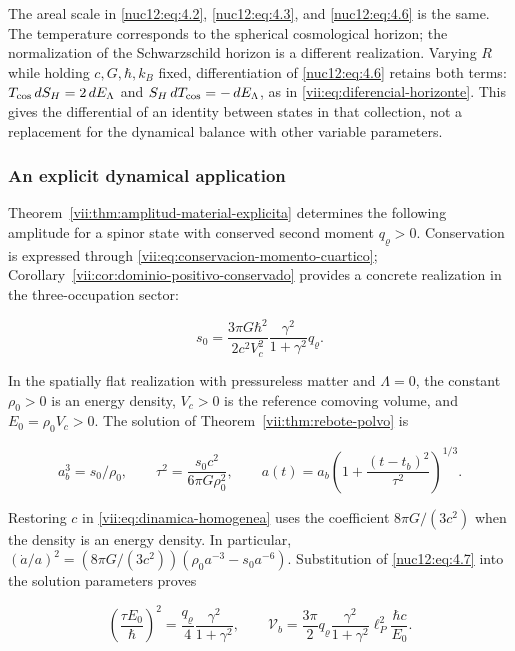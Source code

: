 The areal scale in \eqref{nuc12:eq:4.2}, \eqref{nuc12:eq:4.3}, and \eqref{nuc12:eq:4.6} is the same. The temperature corresponds to the spherical cosmological horizon; the normalization of the Schwarzschild horizon is a different realization. Varying \(R\) while holding \(c,G,\hbar,k_B\) fixed, differentiation of \eqref{nuc12:eq:4.6} retains both terms: \(T_{\rm cos}\,dS_H=2\,dE_\Lambda\) and \(S_H\,dT_{\rm cos}=-\,dE_\Lambda\), as in \eqref{vii:eq:diferencial-horizonte}. This gives the differential of an identity between states in that collection, not a replacement for the dynamical balance with other variable parameters.

\subsubsection{An explicit dynamical application}

Theorem~\ref{vii:thm:amplitud-material-explicita} determines the following amplitude for a spinor state with conserved second moment \(q_\varrho>0\). Conservation is expressed through \eqref{vii:eq:conservacion-momento-cuartico}; Corollary~\ref{vii:cor:dominio-positivo-conservado} provides a concrete realization in the three-occupation sector:

\begin{equation}
s_0=\frac{3\pi G\hbar^2}{2c^2V_c^2}
\frac{\gamma^2}{1+\gamma^2}q_\varrho .
\label{nuc12:eq:4.7}
\end{equation}

In the spatially flat realization with pressureless matter and \(\Lambda=0\), the constant \(\rho_0>0\) is an energy density, \(V_c>0\) is the reference comoving volume, and \(E_0=\rho_0V_c>0\). The solution of Theorem~\ref{vii:thm:rebote-polvo} is

\[
a_b^3=s_0/\rho_0,\qquad
\tau^2=\frac{s_0c^2}{6\pi G\rho_0^2},\qquad
a(t)=a_b\left(1+\frac{(t-t_b)^2}{\tau^2}\right)^{1/3}.
\]

Restoring \(c\) in \eqref{vii:eq:dinamica-homogenea} uses the coefficient \(8\pi G/(3c^2)\) when the density is an energy density. In particular, \((\dot a/a)^2=(8\pi G/(3c^2))(\rho_0a^{-3}-s_0a^{-6})\). Substitution of \eqref{nuc12:eq:4.7} into the solution parameters proves

\begin{equation}
\boxed{\left(\frac{\tau E_0}{\hbar}\right)^2
=\frac{q_\varrho}{4}\frac{\gamma^2}{1+\gamma^2},\qquad
\mathcal V_b=\frac{3\pi}{2}q_\varrho
\frac{\gamma^2}{1+\gamma^2}\ell_P^2\frac{\hbar c}{E_0}.}
\label{nuc12:eq:4.8}
\end{equation}

